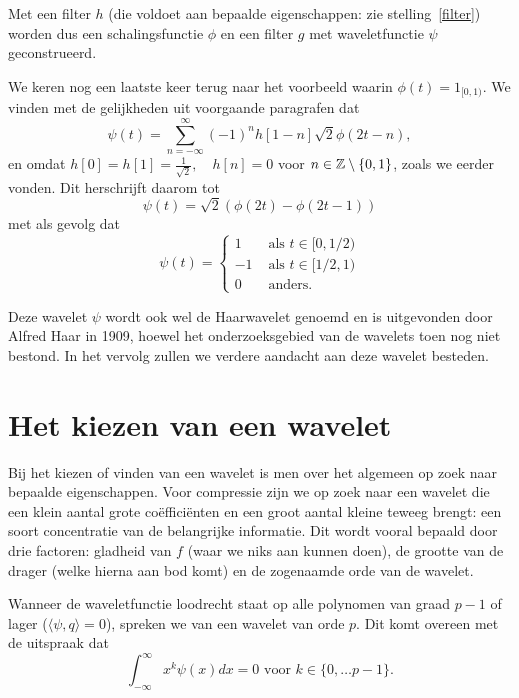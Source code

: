 Met een filter $h$ (die voldoet aan bepaalde eigenschappen: zie stelling~\ref{filter}) worden dus een schalingsfunctie $\phi$ en een filter $g$ met waveletfunctie $\psi$ geconstrueerd.

\begin{voorbeeld}
  We keren nog een laatste keer terug naar het voorbeeld waarin $\phi(t) = 1_{[0,1)}$. 
    We vinden met de gelijkheden uit voorgaande paragrafen dat
    \[
    \psi\left(t\right) = \sum_{n=-\infty}^{\infty} (-1)^{n}h[1-n] \sqrt{2}\phi(2t-n),
    \]
    en omdat $h[0] = h[1] = \frac 1 {\sqrt{2}},\quad h[n] = 0$ voor $n \in \mathbb{Z} \setminus \{0,1\}$, 
    zoals we eerder vonden. Dit herschrijft daarom tot
    \[
    \psi\left(t\right) = \sqrt{2}\left(\phi(2t) - \phi(2t - 1)\right)
    \]
    met als gevolg dat
    \[
    \psi(t) = \begin{cases} 1 & \text{ als } t \in [0,1/2) \\ -1 & \text{ als } t \in [1/2,1) \\ 0 & \text{ anders.} \end{cases}
    \]

    Deze wavelet $\psi$ wordt ook wel de Haarwavelet genoemd en is uitgevonden door Alfred Haar in 1909, hoewel het onderzoeksgebied van de wavelets toen nog niet bestond. In het vervolg zullen we verdere aandacht aan deze wavelet besteden.
\end{voorbeeld}

\section{Het kiezen van een wavelet}
Bij het kiezen of vinden van een wavelet is men over het algemeen op zoek naar bepaalde eigenschappen. Voor compressie zijn we op zoek naar een wavelet die een klein aantal grote co\"effici\"enten en een groot aantal kleine teweeg brengt: een soort concentratie van de belangrijke informatie. Dit wordt vooral bepaald door drie factoren: gladheid van $f$ (waar we niks aan kunnen doen), de grootte van de drager (welke hierna aan bod komt) en de zogenaamde orde van de wavelet.

\begin{definitie}
  Wanneer de waveletfunctie loodrecht staat op alle polynomen van graad $p-1$ of lager ($\langle \psi, q\rangle = 0$), 
  spreken we van een wavelet van orde $p$. Dit komt overeen met de uitspraak dat
  \[
  \int_{-\infty}^\infty x^k \psi(x) dx = 0 \text{ voor } k \in \{ 0, \ldots p-1 \}.
  \]
\end{definitie}

